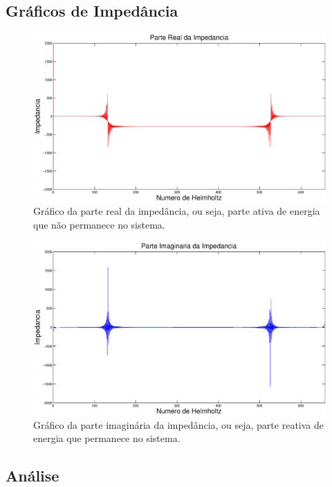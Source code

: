 \subsection{Gráficos de Impedância}
\begin{figure}[h!]
    \centering
 	\hspace{-2.5cm}
    \includegraphics[width=1\textwidth]{code_matlab/code_refactored/closed-closed/parte_real_ativa.eps}
    \caption{Gráfico da parte real da impedância, ou seja, parte ativa de energia que não permanece no sistema.}
    \label{fig3}
\end{figure}
\begin{figure}[h!]
    \centering
 	\hspace{-2.5cm}
    \includegraphics[width=1\textwidth]{code_matlab/code_refactored/closed-closed/parte_imaginaria_reativa.eps}
    \caption{Gráfico da parte imaginária da impedância, ou seja, parte reativa de energia que permanece no sistema.}
    \label{fig4}
\end{figure}

\subsection{Análise}

